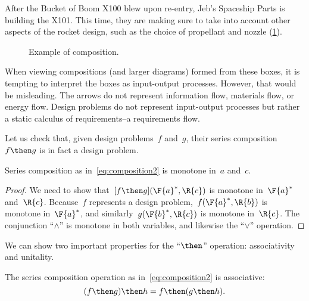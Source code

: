 \begin{example}
  After the Bucket of Boom X100 blew upon re-entry, Jeb's Spaceship Parts is building the X101. This time, they are making sure to take into account other aspects of the rocket design, such as the choice of propellant and nozzle (\cref{fig:examplecomposition}).
  \begin{figure}[h!]
    \begin{center}
    \end{center}
    \caption{Example of composition. \label{fig:examplecomposition}}
  \end{figure}
\end{example}

\begin{remark}
  When viewing compositions (and larger diagrams) formed from these boxes, it is tempting to interpret the boxes as input-output processes. However, that would be misleading. The arrows do not represent information flow, materials flow, or energy flow. Design problems do not represent input-output processes but rather a static calculus of requirements--a requirements flow.
\end{remark}

Let us check that, given design problems~$f$ and~$g$, their series composition~$f\then g$ is in fact a design problem.
\begin{lemma}
  Series composition as in~\cref{eq:composition2} is monotone in~$a$ and~$c$.
\end{lemma}
\begin{proof}
  We need to show that~$[f\then g](\F{a}^*,\R{c})$ is monotone in~$\F{a}^*$ and~$\R{c}$. Because~$f$ represents a design problem,~$f(\F{a}^*,\R{b})$ is monotone in~$\F{a}^*$, and similarly~$g(\F{b}^*,\R{c})$ is monotone in~$\R{c}$. The conjunction ``$\wedge$'' is monotone in both variables, and likewise the ``$\vee$'' operation.
\end{proof}

We can show two important properties for the ``$\then$'' operation: associativity and unitality.
\begin{lemma}
  The series composition operation as in~\cref{eq:composition2} is associative:
  \begin{equation}
  (f\then g)
    \then h = f\then (g\then h).
  \end{equation}
\end{lemma}

